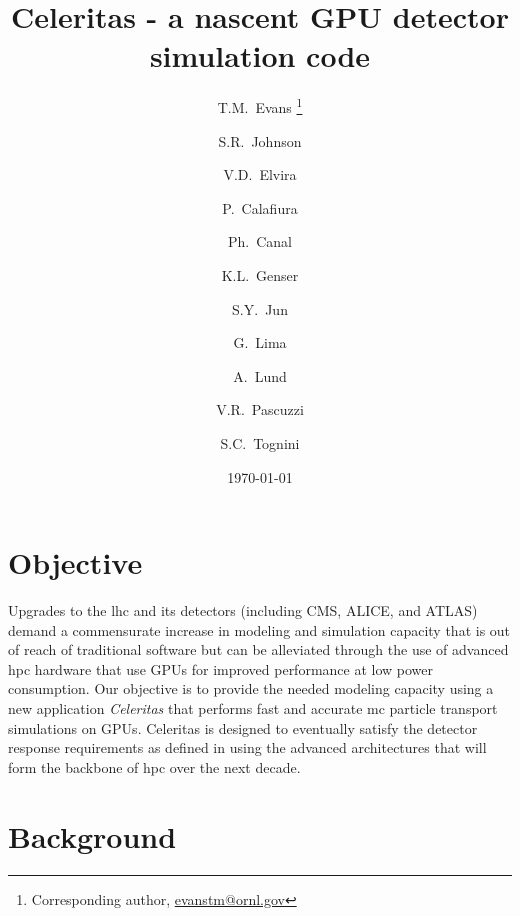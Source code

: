 \documentclass[10pt]{article}
\author[1]{T.M.~Evans
  \footnote{Corresponding author,
  \href{mailto:evanstm@ornl.gov}{evanstm@ornl.gov}}}
\author[1]{S.R.~Johnson}
\author[2]{V.D.~Elvira}
\author[3]{P.~Calafiura}
\author[2]{Ph.~Canal}
\author[2]{K.L.~Genser}
\author[2]{S.Y.~Jun}
\author[2]{G.~Lima}
\author[4]{A.~Lund}
\author[3]{V.R.~Pascuzzi}
\author[1]{S.C.~Tognini}
\affil[1]{Oak Ridge National Laboratory}
\affil[2]{Fermi National Accelerator Laboratory}
\affil[3]{Lawrence Berkeley National Laboratory}
\affil[4]{Argonne National Laboratory}
\title{Celeritas - a nascent GPU detector simulation code}
\date{\today}
\begin{document}
\maketitle

\section*{Objective}

Upgrades to the \ac{lhc} and its detectors (including CMS, ALICE, and ATLAS)
demand a commensurate increase in modeling and simulation capacity that is out
of reach of traditional software but can be alleviated through the use of
advanced \ac{hpc} hardware that use GPUs for improved performance at low power
consumption.  Our objective is to provide the needed modeling capacity using a
new application \emph{Celeritas} that performs fast and accurate \ac{mc}
particle transport simulations on GPUs. Celeritas is designed to eventually
satisfy the detector response requirements as defined in
\cite{the_hep_software_foundation_roadmap_2019} using  the advanced
architectures that will form the backbone of \ac{hpc} over the next decade.




\section*{Background}
\end{document}
